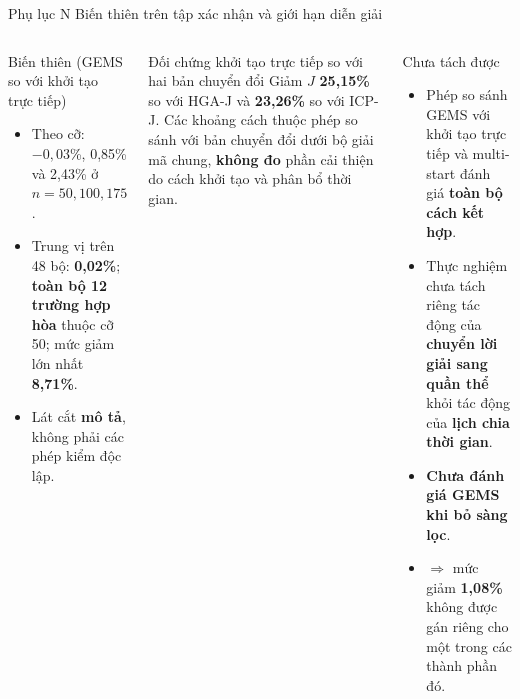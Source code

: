 \documentclass[aspectratio=169,10pt,t,xcolor={table}]{beamer}
\newcommand{\apptitle}[2]{Phụ lục #1 \textperiodcentered{} #2}
\begin{document}
\begin{frame}{\apptitle{N}{Biến thiên trên tập xác nhận và giới hạn diễn giải}}
\begin{columns}[T,onlytextwidth]
\begin{block}{Biến thiên (GEMS so với khởi tạo trực tiếp)}
\scriptsize
\begin{itemize}
\item Theo cỡ: $-0{,}03$\%, 0,85\% và 2,43\% ở $n=50,100,175$.
\item Trung vị trên 48 bộ: \textbf{0,02\%}; \textbf{toàn bộ 12 trường hợp hòa} thuộc cỡ 50; mức giảm lớn nhất \textbf{8,71\%}.
\item Lát cắt \textbf{mô tả}, không phải các phép kiểm độc lập.
\end{itemize}
\end{block}
\begin{block}{Đối chứng khởi tạo trực tiếp so với hai bản chuyển đổi}
\scriptsize Giảm $J$ \textbf{25,15\%} so với HGA-J và \textbf{23,26\%} so với ICP-J. Các khoảng cách thuộc phép so sánh với bản chuyển đổi dưới bộ giải mã chung, \textbf{không đo} phần cải thiện do cách khởi tạo và phân bổ thời gian.
\end{block}
\begin{alertblock}{Chưa tách được}
\scriptsize
\begin{itemize}
\item Phép so sánh GEMS với khởi tạo trực tiếp và multi-start đánh giá \textbf{toàn bộ cách kết hợp}.
\item Thực nghiệm chưa tách riêng tác động của \textbf{chuyển lời giải sang quần thể} khỏi tác động của \textbf{lịch chia thời gian}.
\item \textbf{Chưa đánh giá GEMS khi bỏ sàng lọc}.
\item $\Rightarrow$ mức giảm \textbf{1,08\%} không được gán riêng cho một trong các thành phần đó.
\end{itemize}
\end{alertblock}
\end{columns}
\end{frame}
\end{document}
